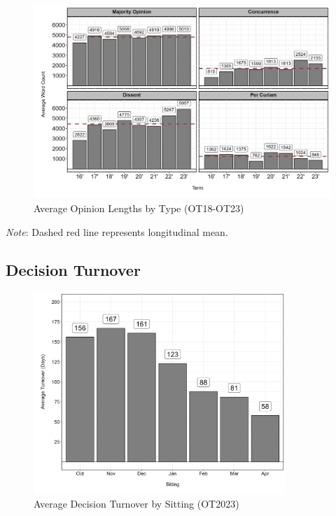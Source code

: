 \newpage

\begin{landscape}
\begin{figure}[H]
\centering
\caption{Average Opinion Lengths by Type (OT18-OT23)}
\vspace{1.5mm}
\includegraphics[width = 1.25\textwidth]{"Figures/statpack_figures/opinion_lengths_longitudinal.png"}

\end{figure}

\vspace{0.5mm}

\centering
\footnotesize{\emph{Note}: Dashed red line represents longitudinal mean.}


\newpage

\subsection{\centering Decision Turnover}

\begin{figure}[H]
\centering
\caption{Average Decision Turnover by Sitting (OT2023)}
\vspace{1.5mm}
\includegraphics[width = 0.85\textwidth]{Figures/statpack_figures/decision_turnover_OT23.png}
\end{figure}


\end{landscape}
